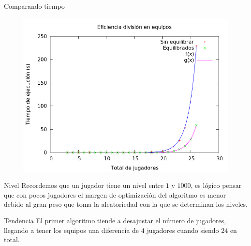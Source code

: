 \begin{frame}
	\begin{exampleblock}{Comparando tiempo}
	\begin{figure}[H]
    		\centering
	    \includegraphics[scale=0.4]{../Equipos/Graficas/tiempos.png}
    		\label{fig:divisionTiempos}
	\end{figure}
	\end{exampleblock}
\end{frame}

\begin{frame}
	\begin{block}{Nivel}
	Recordemos que un jugador tiene un nivel entre $1$ y $1000$, es lógico pensar que con pocos 
	jugadores el margen de optimización del algoritmo es menor debido al gran peso que toma la
	aleatoriedad con la que se determinan los niveles.
	\end{block}
	
	\begin{block}{Tendencia}
	El primer algoritmo tiende a desajustar el número de jugadores, llegando a tener los equipos 
	una diferencia de $4$ jugadores cuando siendo $24$ en total.
	\end{block}
\end{frame}

